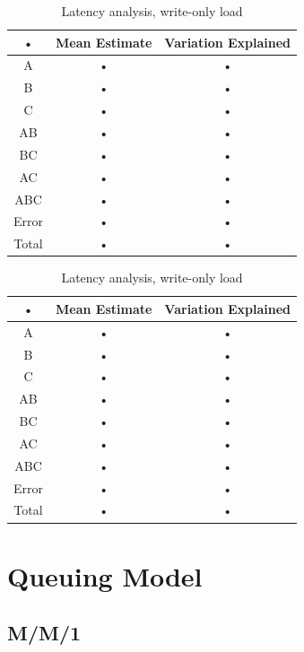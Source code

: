 \documentclass[11pt,a4paper]{article}
\begin{document}
\begin{table}
\begin{minipage}{.5\textwidth}
\centering
	\begin{tabular}{|c|c|c|}
	\hline 
	• & {\small Mean Estimate} & {\small Variation Explained} \\ 
	\hline 
	A & • & • \\ 
	\hline 
	B & • & • \\ 
	\hline 
	C & • & • \\ 
	\hline 
	AB & • & • \\ 
	\hline 
	BC & • & • \\ 
	\hline 
	AC & • & • \\ 
	\hline 
	ABC & • & • \\ 
	\hline 
	Error & • & • \\ 
	\hline 
	Total & • & • \\ 
	\hline 
	\end{tabular} \caption{Throughput analysis, write-only load} \label{tab:2k-tpt-wo}
\end{minipage}%
\begin{minipage}{.5\textwidth}
\centering
	\begin{tabular}{|c|c|c|}
	\hline 
	• & {\small Mean Estimate} & {\small Variation Explained} \\ 
	\hline 
	A & • & • \\ 
	\hline 
	B & • & • \\ 
	\hline 
	C & • & • \\ 
	\hline 
	AB & • & • \\ 
	\hline 
	BC & • & • \\ 
	\hline 
	AC & • & • \\ 
	\hline 
	ABC & • & • \\ 
	\hline 
	Error & • & • \\ 
	\hline 
	Total & • & • \\ 
	\hline 
	\end{tabular} \caption{Latency analysis, write-only load} \label{tab:2k-lat-wo}
\end{minipage}
\end{table}\label{tab:2k-wo}

\section{Queuing Model} \label{sec:queueing-model}

\subsection{M/M/1} \label{sec:mm1}
\end{document}
